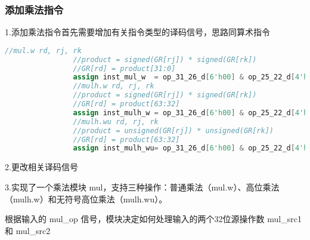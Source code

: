 \documentclass[12pt,a4paper]{article}
\begin{document}
        \subsubsection{添加乘法指令}
            1.添加乘法指令首先需要增加有关指令类型的译码信号，思路同算术指令
            \begin{lstlisting}[language=Verilog]
                //mul.w rd, rj, rk
                //product = signed(GR[rj]) * signed(GR[rk])
                //GR[rd] = product[31:0]
                assign inst_mul_w  = op_31_26_d[6'h00] & op_25_22_d[4'h0] & op_21_20_d[2'h1] & op_19_15_d[5'h18];
                //mulh.w rd, rj, rk
                //product = signed(GR[rj]) * signed(GR[rk])
                //GR[rd] = product[63:32]
                assign inst_mulh_w = op_31_26_d[6'h00] & op_25_22_d[4'h0] & op_21_20_d[2'h1] & op_19_15_d[5'h19];
                //mulh.wu rd, rj, rk
                //product = unsigned(GR[rj]) * unsigned(GR[rk])
                //GR[rd] = product[63:32]
                assign inst_mulh_wu= op_31_26_d[6'h00] & op_25_22_d[4'h0] & op_21_20_d[2'h1] & op_19_15_d[5'h1a];
            \end{lstlisting}
            2.更改相关译码信号
            \par
            3.实现了一个乘法模块 mul，支持三种操作：普通乘法（mul.w）、高位乘法（mulh.w）和无符号高位乘法（mulh.wu）。
            \par
            根据输入的 mul_op 信号，模块决定如何处理输入的两个32位源操作数 mul_src1 和 mul_src2
            \par
\end{document}
